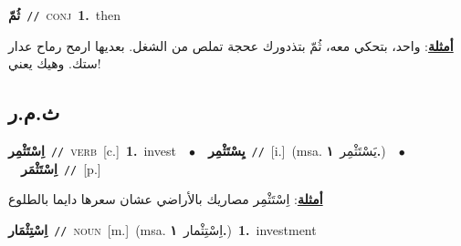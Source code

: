\documentclass[10pt,a4paper,twoside]{article} %
\begin{document}
\begin{multicols}{2}
{{{{{{{{{{\setlength\topsep{0pt}\textbf{\foreignlanguage{arabic}{ثُمّ}}\ {\color{gray}\texttt{//}\color{black}}\ \textsc{conj}\ \textbf{1.}~then\  \begin{flushright}\color{gray}\foreignlanguage{arabic}{\textbf{\underline{\foreignlanguage{arabic}{أمثلة}}}: واحد، بتحكي معه، ثُمّ بتذدورك عحجة تملص من الشغل. بعديها ارمح رماح عدار ستك. وهيك يعني!}\end{flushright}\color{black}} \vspace{2mm}

\vspace{-3mm}
\subsection*{\color{blue}\foreignlanguage{arabic}{ث.م.ر}\color{blue}{}} 

{\setlength\topsep{0pt}\textbf{\foreignlanguage{arabic}{اِسْتَثْمِر}}\ {\color{gray}\texttt{//}\color{black}}\ \textsc{verb}\ [c.]\ \textbf{1.}~invest\ \ $\bullet$\ \ \setlength\topsep{0pt}\textbf{\foreignlanguage{arabic}{يِسْتَثْمِر}}\ {\color{gray}\texttt{//}\color{black}}\ [i.]\ \color{gray}(msa. \foreignlanguage{arabic}{يَسْتَثْمِر}~\foreignlanguage{arabic}{\textbf{١.}})\color{black}\ \ $\bullet$\ \ \setlength\topsep{0pt}\textbf{\foreignlanguage{arabic}{اِسْتَثْمَر}}\ {\color{gray}\texttt{//}\color{black}}\ [p.]\  \begin{flushright}\color{gray}\foreignlanguage{arabic}{\textbf{\underline{\foreignlanguage{arabic}{أمثلة}}}: اِسْتَثْمِر مصاريك بالأراضي عشان سعرها دايما بالطلوع}\end{flushright}\color{black}} \vspace{2mm}

{\setlength\topsep{0pt}\textbf{\foreignlanguage{arabic}{اِسْتِثْمَار}}\ {\color{gray}\texttt{//}\color{black}}\ \textsc{noun}\ [m.]\ \color{gray}(msa. \foreignlanguage{arabic}{اِسْتِثْمار}~\foreignlanguage{arabic}{\textbf{١.}})\color{black}\ \textbf{1.}~investment\ 

}}}}}}}}}}
\end{multicols}
\end{document}
